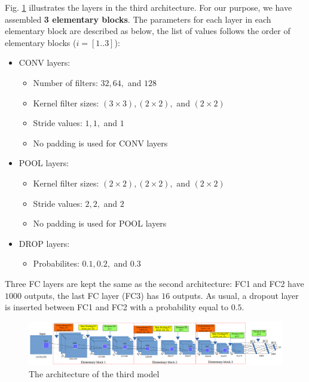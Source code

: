 \documentclass[review]{elsarticle}
\begin{document}
Fig. \ref{fignet3} illustrates the layers in the third architecture. For our purpose, we have assembled \textbf{3 elementary blocks}. The parameters for each layer in each elementary block are described as below, the list of values follows the order of elementary blocks ($i = [1..3]$):
\begin{itemize}
	\item CONV layers:
	\begin{itemize}
		\item Number of filters: $32, 64, $ and $128$
		\item Kernel filter sizes: $(3 \times 3), (2 \times 2), $ and $(2 \times 2)$
		\item Stride values: $1, 1, $ and $1$
		\item No padding is used for CONV layers 
	\end{itemize}
	\item POOL layers:
		\begin{itemize}
			\item Kernel filter sizes: $(2 \times 2), (2 \times 2), $ and $(2 \times 2)$
			\item Stride values: $2, 2, $ and $2$
			\item No padding is used for POOL layers
		\end{itemize}
	\item DROP layers:
		\begin{itemize}
			\item Probabilites: $0.1, 0.2, $ and $0.3$
		\end{itemize}
\end{itemize}

Three FC layers are kept the same as the second architecture: FC1 and FC2 have $1000$ outputs, the last FC layer (FC3) has $16$ outputs. As usual, a dropout layer is inserted between FC1 and FC2 with a probability equal to $0.5$.
\begin{figure}[h]
	\centering
	\includegraphics[scale=0.2]{images/arch_model}
	\caption{The architecture of the third model}
	\label{fignet3}
\end{figure}
\end{document}
